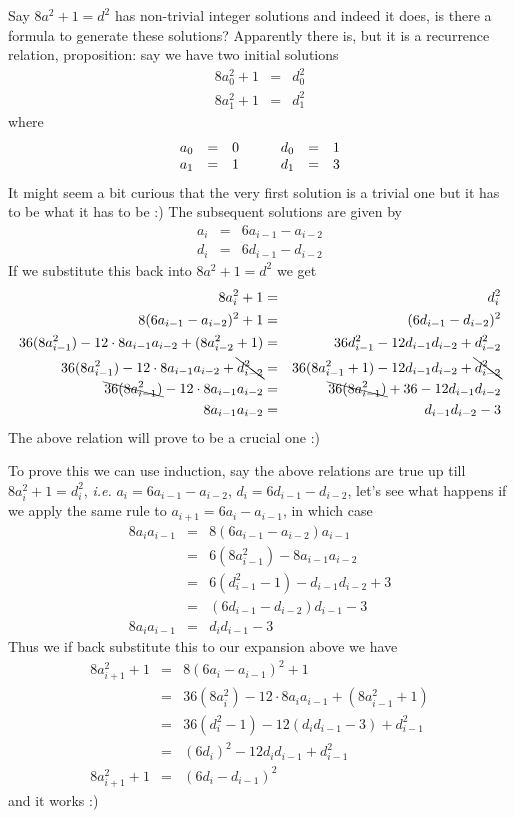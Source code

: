 \documentclass[aps,preprint,preprintnumbers,nofootinbib,showpacs,prd]{revtex4-1}
\newcommand{\ie}{{\it i.e.} }
\newcommand{\ba}{\begin{array}}
\newcommand{\ea}{\end{array}}
\newcommand{\nbea}{\begin{eqnarray*}}
\newcommand{\neea}{\end{eqnarray*}}
\begin{document}
Say $8a^2 + 1 = d^2$ has non-trivial integer solutions and indeed it does, is there a formula to generate these solutions? Apparently there is, but it is a recurrence relation, proposition: say we have two initial solutions
%
\nbea
8a_0^2 + 1 & = & d_0^2 \\
8a_1^2 + 1 & = & d_1^2
\neea
%
where
%
\nbea
\ba{r c l c r c l}
a_0 & = & 0 & ~~~ & d_0 & = & 1\\
a_1 & = & 1 & ~~~ & d_1 & = & 3
\ea
\neea
%
It might seem a bit curious that the very first solution is a trivial one but it has to be what it has to be :) The subsequent solutions are given by
%
\nbea
a_i & = & 6a_{i-1} - a_{i-2} \\
d_i & = & 6d_{i-1} - d_{i-2}
\neea
%
If we substitute this back into $8a^2 + 1 = d^2$ we get
%
\nbea
8a_i^2 + 1 & = & d_i^2 \\
8(6a_{i-1} - a_{i-2})^2 + 1 & = & (6d_{i-1} - d_{i-2})^2 \\
36 (8 a_{i-1}^2) - 12 \cdot 8 a_{i-1}a_{i-2} + (8a_{i-2}^2 + 1) & = & 36 d_{i-1}^2 - 12 d_{i-1} d_{i-2} + d_{i-2}^2 \\
36 (8 a_{i-1}^2) - 12 \cdot 8 a_{i-1}a_{i-2} + \bcancel{d_{i-2}^2} & = & 36 (8a_{i-1}^2 + 1) - 12 d_{i-1} d_{i-2} + \bcancel{d_{i-2}^2} \\
\bcancel{36 (8 a_{i-1}^2)} - 12 \cdot 8 a_{i-1}a_{i-2}  & = & \bcancel{36 (8 a_{i-1}^2)} + 36 - 12 d_{i-1} d_{i-2} \\
8 a_{i-1}a_{i-2}  & = & d_{i-1} d_{i-2} - 3
\neea
%
The above relation will prove to be a crucial one :)

To prove this we can use induction, say the above relations are true up till $8a_i^2 + 1 = d_i^2$, \ie $a_i = 6a_{i-1} - a_{i-2}$, $d_i = 6d_{i-1} - d_{i-2}$, let's see  what happens if we apply the same rule to $a_{i+1} = 6a_{i} - a_{i-1}$, in which case
%
\nbea
8 a_i a_{i-1} & = & 8 (6a_{i-1} - a_{i-2}) a_{i-1} \\
& = & 6 (8a_{i-1}^2) - 8a_{i-1}a_{i-2} \\
& = & 6 (d_{i-1}^2 - 1) - d_{i-1} d_{i-2} + 3 \\
& = & (6 d_{i-1} - d_{i-2})d_{i-1} - 3 \\
8 a_i a_{i-1} & = & d_id_{i-1} - 3
\neea
%
Thus we if back substitute this to our expansion above we have
%
\nbea
8a_{i+1}^2 + 1 & = & 8(6a_{i} - a_{i-1})^2 + 1 \\
& = & 36 (8 a_{i}^2) - 12 \cdot 8 a_{i}a_{i-1} + (8a_{i-1}^2 + 1)  \\
& = & 36 (d_{i}^2 - 1) - 12 (d_id_{i-1} - 3) + d_{i-1}^2 \\
& = & (6d_{i})^2  - 12 d_id_{i-1} + d_{i-1}^2 \\
8a_{i+1}^2 + 1 & = & (6d_{i} -  d_{i-1})^2
\neea
%
and it works :)
\end{document}
